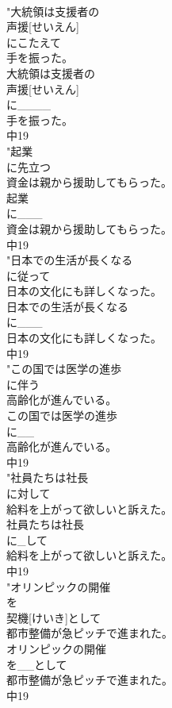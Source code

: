 \documentclass[8pt]{extreport}
\begin{document}
\begin{CJK}{UTF8}{min}
\\	"大統領は支援者の
\\	声援[せいえん]
\\	にこたえて
\\	手を振った。
\\	大統領は支援者の
\\	声援[せいえん]
\\	に____
\\	手を振った。
\\	中19
\\	"起業
\\	に先立つ
\\	資金は親から援助してもらった。
\\	起業
\\	に___
\\	資金は親から援助してもらった。
\\	中19
\\	"日本での生活が長くなる
\\	に従って
\\	日本の文化にも詳しくなった。
\\	日本での生活が長くなる
\\	に___
\\	日本の文化にも詳しくなった。
\\	中19
\\	"この国では医学の進歩
\\	に伴う
\\	高齢化が進んでいる。
\\	この国では医学の進歩
\\	に__
\\	高齢化が進んでいる。
\\	中19
\\	"社員たちは社長
\\	に対して
\\	給料を上がって欲しいと訴えた。
\\	社員たちは社長
\\	に_して
\\	給料を上がって欲しいと訴えた。
\\	中19
\\	"オリンピックの開催
\\	を
\\	契機[けいき]として
\\	都市整備が急ピッチで進まれた。
\\	オリンピックの開催
\\	を__として
\\	都市整備が急ピッチで進まれた。
\\	中19

\end{CJK}
\end{document}

